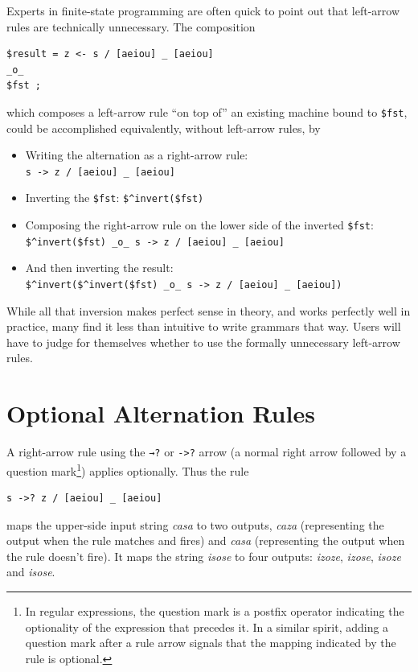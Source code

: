 Experts in finite-state programming are often quick to point out that left-arrow rules
are technically unnecessary.  The composition

\begin{Verbatim}
$result = z <- s / [aeiou] _ [aeiou] 
_o_ 
$fst ;
\end{Verbatim}

\noindent
which composes a left-arrow rule ``on top of'' an existing machine bound to \verb!$fst!,
could be accomplished equivalently, without left-arrow rules, by 

\begin{itemize}
\item
Writing the alternation as a right-arrow rule:\\\verb!s -> z / [aeiou] _ [aeiou]!
\item
Inverting the \verb!$fst!:  \verb!$^invert($fst)!
\item
Composing the right-arrow rule on the lower side of the inverted \verb!$fst!:
\verb!$^invert($fst) _o_ s -> z / [aeiou] _ [aeiou]!
\item
And then inverting the result:\\ 
\verb!$^invert($^invert($fst) _o_ s -> z / [aeiou] _ [aeiou])!
\end{itemize}


\noindent 
While all that inversion makes perfect sense in theory, and works
perfectly well in practice,
many find it less than intuitive to write grammars that way.
Users will have to judge for themselves whether to use
the formally unnecessary left-arrow rules.

\section{Optional Alternation Rules}

A right-arrow rule using the \texttt{→?} or \texttt{->?} arrow (a normal right arrow followed by a question
mark\footnote{In regular expressions, the question mark is a postfix operator indicating the optionality of the expression that
precedes it.  In a similar spirit, adding a question mark after a rule arrow signals that the mapping indicated by the rule is
optional.}) applies optionally.  Thus
the rule

\begin{Verbatim}
s ->? z / [aeiou] _ [aeiou]
\end{Verbatim}

\noindent
maps the upper-side input string \emph{casa} to two outputs, \emph{caza} (representing the output when
the rule matches and fires) and
\emph{casa} (representing the output when the rule doesn't fire).  It 
maps the string \emph{isose} to four outputs:
\emph{izoze}, \emph{izose}, \emph{isoze} and \emph{isose}.

